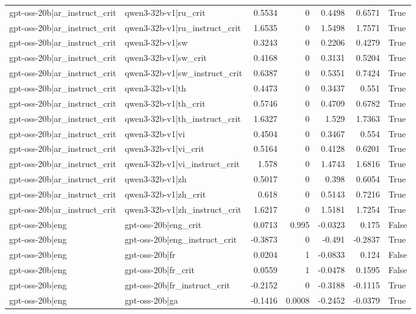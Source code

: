 \begin{table}
\begin{tabular}{l l r r r r l}
gpt-oss-20b|ar_instruct_crit & qwen3-32b-v1|ru_crit & 0.5534 & 0 & 0.4498 & 0.6571 & True \\
gpt-oss-20b|ar_instruct_crit & qwen3-32b-v1|ru_instruct_crit & 1.6535 & 0 & 1.5498 & 1.7571 & True \\
gpt-oss-20b|ar_instruct_crit & qwen3-32b-v1|sw & 0.3243 & 0 & 0.2206 & 0.4279 & True \\
gpt-oss-20b|ar_instruct_crit & qwen3-32b-v1|sw_crit & 0.4168 & 0 & 0.3131 & 0.5204 & True \\
gpt-oss-20b|ar_instruct_crit & qwen3-32b-v1|sw_instruct_crit & 0.6387 & 0 & 0.5351 & 0.7424 & True \\
gpt-oss-20b|ar_instruct_crit & qwen3-32b-v1|th & 0.4473 & 0 & 0.3437 & 0.551 & True \\
gpt-oss-20b|ar_instruct_crit & qwen3-32b-v1|th_crit & 0.5746 & 0 & 0.4709 & 0.6782 & True \\
gpt-oss-20b|ar_instruct_crit & qwen3-32b-v1|th_instruct_crit & 1.6327 & 0 & 1.529 & 1.7363 & True \\
gpt-oss-20b|ar_instruct_crit & qwen3-32b-v1|vi & 0.4504 & 0 & 0.3467 & 0.554 & True \\
gpt-oss-20b|ar_instruct_crit & qwen3-32b-v1|vi_crit & 0.5164 & 0 & 0.4128 & 0.6201 & True \\
gpt-oss-20b|ar_instruct_crit & qwen3-32b-v1|vi_instruct_crit & 1.578 & 0 & 1.4743 & 1.6816 & True \\
gpt-oss-20b|ar_instruct_crit & qwen3-32b-v1|zh & 0.5017 & 0 & 0.398 & 0.6054 & True \\
gpt-oss-20b|ar_instruct_crit & qwen3-32b-v1|zh_crit & 0.618 & 0 & 0.5143 & 0.7216 & True \\
gpt-oss-20b|ar_instruct_crit & qwen3-32b-v1|zh_instruct_crit & 1.6217 & 0 & 1.5181 & 1.7254 & True \\
gpt-oss-20b|eng & gpt-oss-20b|eng_crit & 0.0713 & 0.995 & -0.0323 & 0.175 & False \\
gpt-oss-20b|eng & gpt-oss-20b|eng_instruct_crit & -0.3873 & 0 & -0.491 & -0.2837 & True \\
gpt-oss-20b|eng & gpt-oss-20b|fr & 0.0204 & 1 & -0.0833 & 0.124 & False \\
gpt-oss-20b|eng & gpt-oss-20b|fr_crit & 0.0559 & 1 & -0.0478 & 0.1595 & False \\
gpt-oss-20b|eng & gpt-oss-20b|fr_instruct_crit & -0.2152 & 0 & -0.3188 & -0.1115 & True \\
gpt-oss-20b|eng & gpt-oss-20b|ga & -0.1416 & 0.0008 & -0.2452 & -0.0379 & True \\

\end{tabular}
\end{table}
